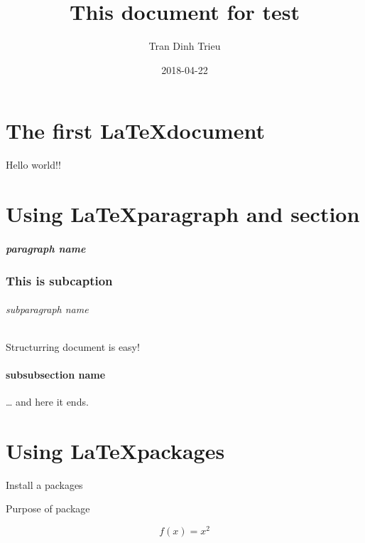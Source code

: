 \documentclass[%
  parskip=full,%
  twoside=false%
]{book}
\title{This document for test}
\author{Tran Dinh Trieu}
\date{2018-04-22}
\begin{document}
  \maketitle


  \setcounter{tocdepth}{2}

  \tableofcontents

\chapter{The first \LaTeX document}

  Hello world!!

\chapter{Using \LaTeX paragraph and section}

\paragraph{paragraph name}


\subsection{This is subcaption}

\subparagraph{subparagraph name}
Structurring document is easy!

\subsubsection{subsubsection name}


\ldots{} and here it ends.

\chapter{Using \LaTeX packages}

Install a packages

Purpose of package

\begin{equation}
  f(x) = x^2
\end{equation}
\end{document}
